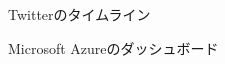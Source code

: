 \begin{figure}[h]
\centering
{}
\caption{Twitterのタイムライン}
\label{twitter}
\end{figure}


\begin{figure}[h]
\centering
{}
\caption{Microsoft Azureのダッシュボード}
\label{asure}
\end{figure}
